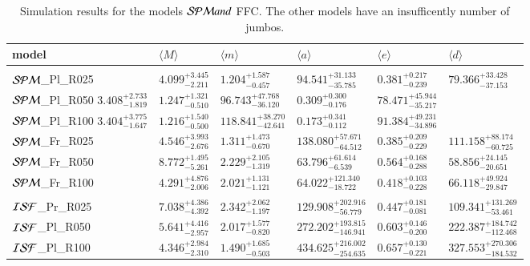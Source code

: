 \documentclass[aa]{lib/aa}
\begin{document}
\begin{table}
  \caption{Simulation results for the models ${\cal SPM} and ${\cal
      FFC}. The other models have an insufficently number of jumbos.}
 \label{Tab:model_parameters}
 \centering 
 \begin{tabular}{llllll}
 \hline\hline
 model & $\langle M \rangle$ & $\langle m \rangle$ & $\langle a \rangle$ & $\langle e \rangle$ & $\langle d \rangle$ \\
 \hline \vspace{-0.75em} \\ 
 ${\cal SPM}$\_Pl\_R025 &$4.099^{+3.445}_{-2.211}$ & $1.204^{+1.587}_{-0.457}$ & $94.541^{+31.133}_{-35.785}$ & $0.381^{+0.217}_{-0.239}$& $79.366^{+33.428}_{-37.153}$  \\
 ${\cal SPM}$\_Pl\_R050 $3.408^{+2.733}_{-1.819}$ & $1.247^{+1.321}_{-0.510}$ & $96.743^{+47.768}_{-36.120}$ & $0.309^{+0.300}_{-0.176}$& $78.471^{+45.944}_{-35.217}$  \\
 ${\cal SPM}$\_Pl\_R100 $3.404^{+3.775}_{-1.647}$ & $1.216^{+1.540}_{-0.500}$ & $118.841^{+38.270}_{-42.641}$ & $0.173^{+0.341}_{-0.112}$& $91.384^{+49.231}_{-34.896}$  \\
 ${\cal SPM}$\_Fr\_R025 &$4.546^{+3.993}_{-2.676}$ & $1.311^{+1.473}_{-0.670}$ & $138.080^{+57.671}_{-64.512}$ & $0.385^{+0.209}_{-0.229}$& $111.158^{+88.174}_{-60.725}$  \\
 ${\cal SPM}$\_Fr\_R050 &$8.772^{+1.495}_{-5.261}$ & $2.229^{+2.105}_{-1.319}$ & $63.796^{+61.614}_{-6.539}$ & $0.564^{+0.168}_{-0.288}$& $58.856^{+24.145}_{-20.651}$  \\
 ${\cal SPM}$\_Fr\_R100 &$4.291^{+4.876}_{-2.006}$ & $2.021^{+1.131}_{-1.121}$ & $64.022^{+121.340}_{-18.722}$ & $0.418^{+0.103}_{-0.228}$& $66.118^{+49.924}_{-29.847}$  \\
 \hline \vspace{-0.75em} \\ 
 ${\cal ISF}$\_Pr\_R025 &$7.038^{+4.386}_{-4.392}$ & $2.342^{+2.062}_{-1.197}$ & $129.908^{+202.916}_{-56.779}$ & $0.447^{+0.181}_{-0.081}$& $109.341^{+131.269}_{-53.461}$  \\
 ${\cal ISF}$\_Pl\_R050 &$5.641^{+4.416}_{-2.957}$ & $2.017^{+1.577}_{-0.820}$ & $272.202^{+193.815}_{-146.941}$ & $0.603^{+0.146}_{-0.200}$& $222.387^{+184.742}_{-112.468}$  \\
 ${\cal ISF}$\_Pl\_R100 &$4.346^{+2.984}_{-2.310}$ & $1.490^{+1.685}_{-0.503}$ & $434.625^{+216.002}_{-254.635}$ & $0.657^{+0.130}_{-0.221}$& $327.553^{+270.306}_{-184.532}$  \\

\end{tabular}
\end{table}
\end{document}
